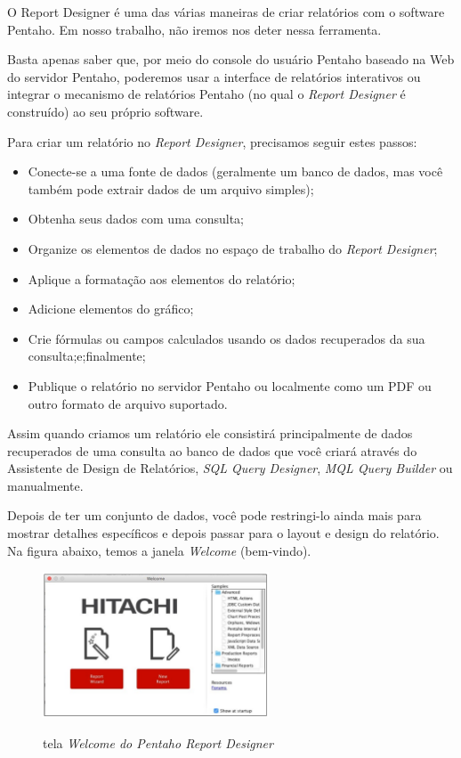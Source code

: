 O Report Designer \'{e} uma das v\'{a}rias maneiras de criar relat\'{o}rios com o software 
Pentaho. Em nosso trabalho, n\~{a}o iremos nos deter nessa ferramenta. 

Basta apenas saber que, por meio do console do usu\'{a}rio Pentaho baseado na Web do servidor Pentaho, 
poderemos usar a interface de relat\'orios interativos ou integrar o mecanismo de relat\'{o}rios 
Pentaho (no qual o \textit{Report Designer} \'{e} constru\'{i}do) ao seu pr\'{o}prio software.

Para criar um relat\'orio no \textit{Report Designer}, precisamos seguir estes passos:

\begin{itemize}
    \item Conecte-se a uma fonte de dados (geralmente um banco de dados, mas você tamb\'{e}m pode extrair dados de um arquivo simples);
    \item Obtenha seus dados com uma consulta;
    \item Organize os elementos de dados no espa\c{c}o de trabalho do \textit{Report Designer};
    \item Aplique a formata\c{c}\~{a}o aos elementos do relat\'orio;
    \item Adicione elementos do gr\'{a}fico;
    \item Crie f\'ormulas ou campos calculados usando os dados recuperados da sua consulta;e;finalmente;
    \item Publique o relat\'orio no servidor Pentaho ou localmente como um PDF ou outro formato de arquivo suportado. 
\end{itemize}

Assim quando criamos um relat\'orio ele consistir\'{a} principalmente de dados recuperados de uma consulta ao banco de dados que você criar\'{a} atrav\'{e}s do Assistente de Design de Relat\'orios, \textit{SQL Query Designer}, \textit{MQL Query Builder} ou manualmente. 

Depois de ter um conjunto de dados, você pode restringi-lo ainda mais para mostrar detalhes espec\'{i}ficos e depois passar para o layout e design do relat\'orio. Na figura abaixo, temos a janela \textit{Welcome} (bem-vindo).

\begin{figure}[H]
	\vspace*{0,2cm}
    \centering
    \caption{tela \textit{Welcome do Pentaho Report Designer}}
    \includegraphics[width=0.6\textwidth]{./04-figuras/figura-welcome-prd}
    \label{fig:ilustfigwelcomeprd}
\end{figure}
\vspace*{-0,9cm}
{\raggedright {}} \\
 
